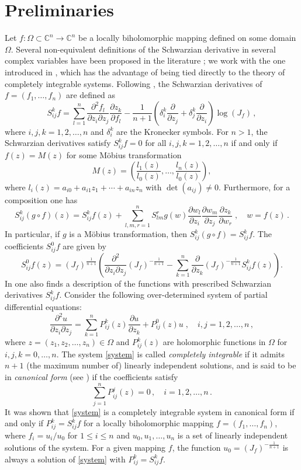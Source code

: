 \documentclass[12pt]{amsart}
\theoremstyle{definition}
\theoremstyle{remark}
\def\dis{\displaystyle}
\def\bq{\begin{equation}}
\def\eq{\end{equation}}
\def\S{{ S^{k}_{ij}}}
\def\Cn{{\mathbb C}^n}
\numberwithin{equation}{section}
\begin{document}
\section{Preliminaries}\label{sec:prelim}

Let $f:\Omega\subset\Cn\rightarrow\Cn$ be a locally
biholomorphic mapping defined on some domain $\Omega$. Several non-equivalent
definitions of the Schwarzian derivative in several complex variables have
been proposed in the literature \cite{MM1, MM2, MT}; we work with the one
introduced in \cite{Oda}, which has the advantage of being tied directly to
the theory of completely integrable systems. Following \cite{Oda}, the
Schwarzian derivatives of $f=(f_1,\ldots,f_n)$ are defined as
\[
\S f= \dis\sum^{n}_{l=1}\frac{\partial^{2} f_{l}}{\partial z_{i}\partial
z_{j}} \frac{\partial z_{k}}{\partial
f_{l}}-\frac{1}{n+1}\left(\delta^{k}_{i}\frac{\partial}{\partial
z_{j}}+\delta^{k}_{j}\frac{\partial}{\partial z_{i}}\right)
\log(J_f)\, ,
\]
where $i,j,k=1,2, \ldots,n$ and $\delta^{k}_{i}$ are the Kronecker symbols.
For $n>1$, the Schwarzian derivatives satisfy $\S f=0$ for all
$i,j,k=1,2,\ldots,n$ if and only if $f(z)=M(z)$ for some M\"{o}bius
transformation
\[
M(z)=\left(\frac{l_1(z)}{l_0(z)},\ldots,\frac{l_n(z)}{l_0(z)}\right),
\]
where $l_i(z)=a_{i0}+a_{i1}z_1+\cdots+a_{in}z_n$ with $\det(a_{ij})\neq 0$.
Furthermore, for a composition one has
\bq\label{chain rule}
\S(g\circ f)(z)=\S f(z)+
\sum^{n}_{l,m,r=1}S^{r}_{lm}g(w)\frac{\partial w_{l}}{\partial z_{i}}
\frac{\partial w_{m}}{\partial z_{j}}
\frac{\partial z_{k}}{\partial w_{r}}\; ,\quad w=f(z)\, .
\eq
In particular, if $g$ is a M\"{o}bius transformation, then
$\S(g\circ f)=\S f$. The coefficients $S^0_{ij}f$ are given by
\[
S^0_{ij}f(z)=(J_f)^{\frac{1}{n+1}}\left(\frac{\partial^2}{\partial
z_i\partial z_j}(J_f)^{-\frac{1}{n+1}}-
\sum_{k=1}^n\frac{\partial}{\partial
z_k}(J_f)^{-\frac{1}{n+1}}S^k_{ij}f(z)\right).
\]
In \cite{Oda} one also finds a description of the functions with prescribed
Schwarzian derivatives $\S f$. Consider the following over-determined system
of partial differential equations:
\bq\label{system}
\frac{\partial^{2}u}{\partial z_{i}\partial z_{j}} =
\sum^{n}_{k=1}P^{k}_{ij}(z)\frac{\partial u}{\partial z_{k}}+
P^{0}_{ij}(z)u \; ,\quad i,j= 1,2, \ldots,n\, ,
\eq
where $z=(z_{1},z_{2},\ldots,z_n)\in \Omega$ and $P^k_{ij}(z)$ are holomorphic
functions in $\Omega$ for $i,j,k=0,\ldots,n$. The system \eqref{system} is
called \textit{completely integrable} if it admits $n+1$ (the maximum number
of) linearly independent solutions, and is said to be in \textit{canonical
form} (see \cite{yoshida1976}) if the coefficients satisfy
\[
\sum_{j=1}^{n} P_{ij}^{j}(z)=0\, ,\quad i=1,2,\ldots,n\, .
\]
It was shown that \eqref{system} is a completely integrable system in canonical
form if and only if $P^k_{ij}=\S f$ for a locally biholomorphic mapping
$f=(f_1, \ldots, f_n)$, where $f_i=u_i/u_0$ for $1\leq i\leq n$ and
$u_0, u_1,\ldots, u_n$ is a set of linearly independent solutions of the
system. For a given mapping $f$, the function $u_0=(J_f)^{-\frac{1}{n+1}}$ is
always a solution of \eqref{system} with $P_{ij}^k=\S f$.
\end{document}
